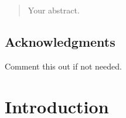 \documentclass[12pt,twoside]{report}
\date{September 2015}
\begin{document}



\clearpage{\pagestyle{empty}\cleardoublepage}
\setcounter{page}{1}
\pagestyle{fancy}

\begin{abstract}
Your abstract.
\end{abstract}

\cleardoublepage
\section*{Acknowledgments}
Comment this out if not needed.

\clearpage{\pagestyle{empty}\cleardoublepage}

\tableofcontents 


\clearpage{\pagestyle{empty}\cleardoublepage}
\setcounter{page}{1}
\fancyhead[LE,RO]{\slshape \rightmark}
\fancyhead[LO,RE]{\slshape \leftmark}

\chapter{Introduction}
\end{document}
